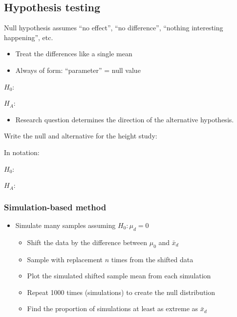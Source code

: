 \documentclass[
]{report}
\providecommand{\tightlist}{%
  \setlength{\itemsep}{0pt}\setlength{\parskip}{0pt}}
\begin{document}
\vspace{0.5in}

\subsection*{Hypothesis testing}\label{hypothesis-testing-6}

Null hypothesis assumes ``no effect'', ``no difference'', ``nothing interesting happening'', etc.

\begin{itemize}
\item
  Treat the differences like a single mean
\item
  Always of form: ``parameter'' = null value
\end{itemize}

\(H_0:\)

\vspace{0.2in}

\(H_A:\)

\vspace{0.2in}

\begin{itemize}
\tightlist
\item
  Research question determines the direction of the alternative hypothesis.
\end{itemize}

Write the null and alternative for the height study:

In notation:

\(H_0:\)

\vspace{0.2in}

\(H_A:\)

\vspace{0.2in}

\subsubsection*{Simulation-based method}\label{simulation-based-method-6}

\begin{itemize}
\item
  Simulate many samples assuming \(H_0: \mu_d = 0\)

  \begin{itemize}
  \item
    Shift the data by the difference between \(\mu_0\) and \(\bar{x}_d\)
  \item
    Sample with replacement \(n\) times from the shifted data
  \item
    Plot the simulated shifted sample mean from each simulation
  \item
    Repeat 1000 times (simulations) to create the null distribution
  \item
    Find the proportion of simulations at least as extreme as \(\bar{x}_d\)
  \end{itemize}
\end{itemize}
\end{document}
